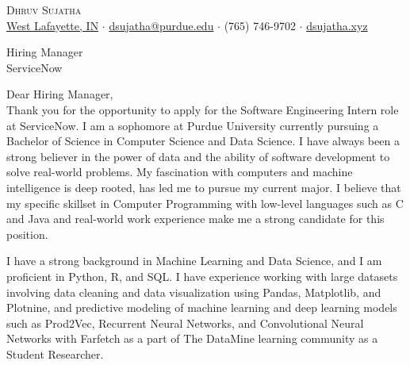 \documentclass[a4paper]{article}
\begin{document}
\vspace*{-40pt}

    

\vspace*{-10pt}
\begin{center}
	{\Huge \scshape {Dhruv Sujatha}}\\
	\href{https://www.google.com/maps/place/West+Lafayette,+IN/}{West Lafayette, IN} $\cdot$ \href{mailto:dsujatha@purdue.edu}{dsujatha@purdue.edu} $\cdot$ (765) 746-9702 $\cdot$ \href{https://dsujatha.xyz}{dsujatha.xyz}\\
\end{center}

\hrulefill
\fontsize{14pt}{17pt}\selectfont

\vspace*{30pt}
Hiring Manager\\
ServiceNow\\

\vspace*{30pt}

Dear Hiring Manager,\\
\vspace*{20pt}
Thank you for the opportunity to apply for the Software Engineering Intern role at ServiceNow. 
I am a sophomore at Purdue University currently pursuing a Bachelor of Science in Computer Science and Data Science.
I have always been a strong believer in the power of data and the ability of software development to solve real-world problems. 
My fascination with computers and machine intelligence is deep rooted, has led me to pursue my current major. 
I believe that my specific skillset in Computer Programming with low-level languages such as C and Java and real-world work experience make me a strong candidate for this position.

\vspace*{20pt}

I have a strong background in Machine Learning and Data Science, 
and I am proficient in Python, R, and SQL. I have experience working with large datasets
involving data cleaning and data visualization using Pandas, Matplotlib, and Plotnine, and predictive modeling of machine learning 
and deep learning models such as Prod2Vec, Recurrent Neural Networks, and Convolutional Neural Networks with Farfetch as a part of The DataMine learning community as a Student Researcher. \\

\vspace*{20pt}
\end{document}
